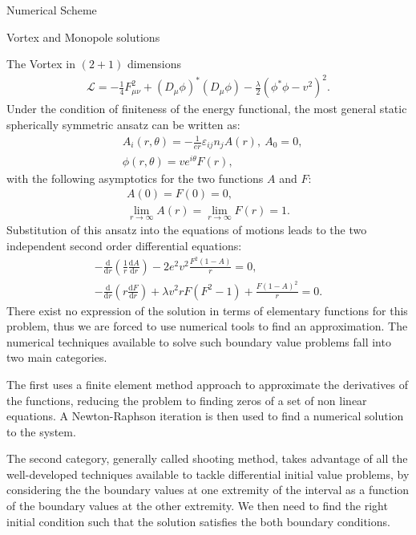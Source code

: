 \begin{section}{Numerical Scheme}
\begin{subsection}{Vortex and Monopole solutions}
\begin{subsubsection}{The Vortex in $(2+1)$ dimensions}
\begin{align}
        \mathcal L = -\frac{1}{4}F^2_{\mu\nu} + (D_\mu\phi)^*(D_\mu\phi)-\frac{\lambda}{2}(\phi^*\phi-v^2)^2.
      \end{align}
      Under the condition of finiteness of the energy functional, the
      most general static spherically symmetric ansatz can be written as:
      \begin{align}
        &A_i(r,\theta) = -\frac{1}{er}\varepsilon_{ij}n_jA(r),\ A_0 = 0,\\
        &\phi(r,\theta) = ve^{i\theta}F(r),
      \end{align}
      with the following asymptotics for the two functions $A$ and $F$:
      \begin{align}
        A(0) = F(0) = 0,\\
        \lim_{r\to\infty}A(r) = \lim_{r\to\infty}F(r) = 1.
      \end{align}
      Substitution of this ansatz into the equations of motions leads
      to the two independent second order differential equations:
      \begin{align}
        -\frac{\mathrm d}{\mathrm d r}\left(\frac{1}{r}\frac{\mathrm d A}{\mathrm d r}\right)-2e^2v^2\frac{F^2(1-A)}{r} = 0,\label{eq:vortex_1}\\
        -\frac{\mathrm d}{\mathrm d r}\left(r\frac{\mathrm d F}{\mathrm d r}\right) + \lambda v^2 r F(F^2-1)+\frac{F(1-A)^2}{r} = 0.\label{eq:vortex_2}
      \end{align}
      There exist no expression of the solution in terms of elementary
      functions for this problem, thus we are forced to use numerical
      tools to find an approximation. The numerical techniques available
      to solve such boundary value problems fall into two main
      categories.

      The first uses a finite element method approach to approximate
      the derivatives of the functions, reducing the problem to
      finding zeros of a set of non linear equations.  A
      Newton-Raphson iteration is then used to find a numerical
      solution to the system.

      The second category, generally called shooting method, takes
      advantage of all the well-developed techniques available to
      tackle differential initial value problems, by considering the
      the boundary values at one extremity of the interval as a
      function of the boundary values at the other extremity. We then
      need to find the right initial condition such that the solution
      satisfies the both boundary conditions.


\end{subsubsection}
\end{subsection}
\end{section}
